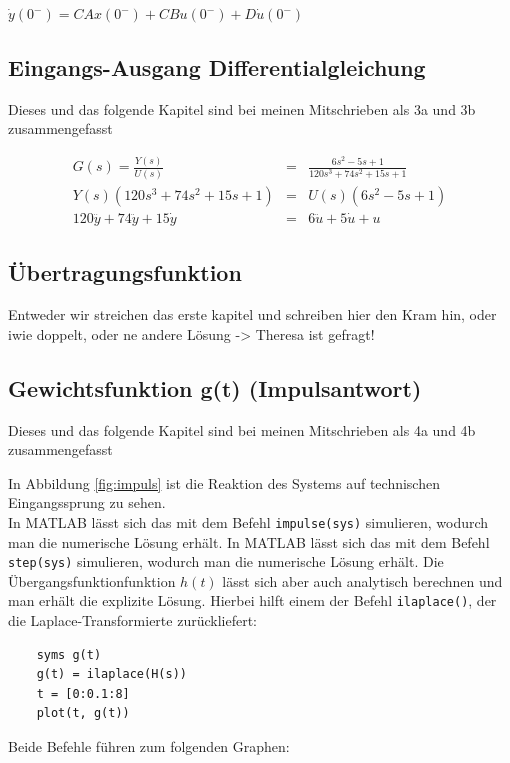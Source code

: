 $ \dot y(0^-) = CAx(0^-) + CBu(0^-) + D \dot u (0^-)$

\subsection{Eingangs-Ausgang Differentialgleichung}

Dieses und das folgende Kapitel sind bei meinen Mitschrieben als 3a und 3b zusammengefasst

\begin{eqnarray*}
    G(s) =\frac{Y(s)}{U(s)} &=& \frac{6s^2 - 5s + 1}{120s^3 + 74s^2 + 15s +1} \\
    Y(s)(120s^3 + 74s^2 + 15s +1) &=& U(s) (6s^2 - 5s + 1) \\
    120 \dddot y + 74 \ddot y + 15 \dot y &=& 6 \ddot u + 5 \dot u + u
\end{eqnarray*}

\subsection{Übertragungsfunktion}
Entweder wir streichen das erste kapitel und schreiben hier den Kram hin, oder iwie doppelt, oder ne andere Lösung -> Theresa ist gefragt!

\subsection{Gewichtsfunktion g(t) (Impulsantwort)}
Dieses und das folgende Kapitel sind bei meinen Mitschrieben als 4a und 4b zusammengefasst


In Abbildung \ref{fig:impuls} ist die Reaktion des Systems auf technischen Eingangssprung zu sehen.
\\
In MATLAB lässt sich das mit dem Befehl \texttt{impulse(sys)} simulieren, wodurch man die numerische Lösung erhält. In MATLAB lässt sich das mit dem Befehl \texttt{step(sys)} simulieren, wodurch man die numerische Lösung erhält. Die Übergangsfunktionfunktion $h(t)$ lässt sich aber auch analytisch berechnen und man erhält die explizite Lösung. Hierbei hilft einem der Befehl \texttt{ilaplace()}, der die Laplace-Transformierte zurückliefert:
\begin{lstlisting}
    syms g(t)
    g(t) = ilaplace(H(s))
    t = [0:0.1:8]
    plot(t, g(t))
\end{lstlisting}

Beide Befehle führen zum folgenden Graphen:



